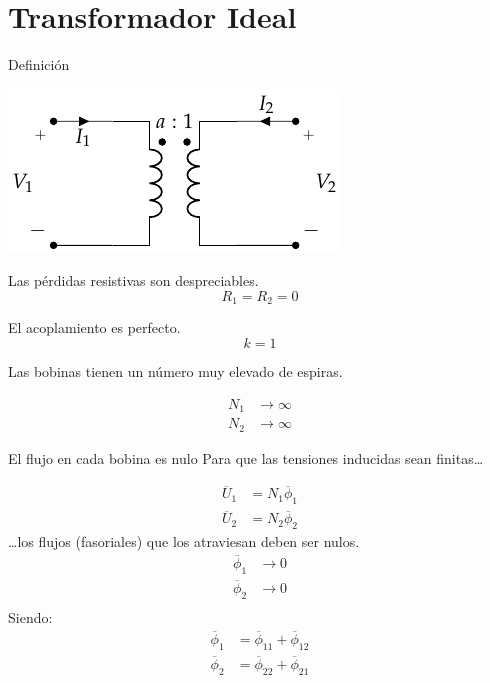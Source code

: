 \documentclass[xcolor={usenames,svgnames,dvipsnames}]{beamer}
\begin{document}
\section{Transformador Ideal}
\label{sec:orgd188875}
\begin{frame}[label={sec:orgc0b1cf1}]{Definición}
\begin{center}
\includegraphics[height=0.35\textheight]{../figs/Trafo_Ideal.pdf}
\end{center}

Las pérdidas resistivas son despreciables.
\[
  R_1 = R_2 = 0
\]

El acoplamiento es perfecto.
\[
  k = 1
\]

Las bobinas tienen un número muy elevado de espiras.

\begin{align*}
  N_1 &\to \infty\\
  N_2 &\to \infty
\end{align*}
\end{frame}
\begin{frame}[label={sec:org56961e6}]{El flujo en cada bobina es nulo}
Para que las tensiones inducidas sean finitas\ldots{} 

\begin{align*}
  \overline{U}_1 &= N_1 \overline{\phi}_1\\ 
  \overline{U}_2 &= N_2 \overline{\phi}_2
\end{align*}
\ldots{}los flujos (fasoriales) que los atraviesan deben ser nulos.
\begin{align*}
  \overline{\phi}_1 &\to 0\\
  \overline{\phi}_2 &\to 0\\
\end{align*}
Siendo:
\begin{align*}
  \overline{\phi}_1 &= \overline{\phi}_{11} + \overline{\phi}_{12}\\
  \overline{\phi}_2 &= \overline{\phi}_{22} + \overline{\phi}_{21}
\end{align*}
\end{frame}
\end{document}
